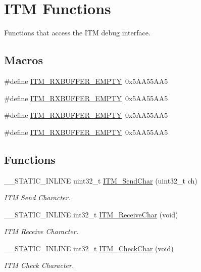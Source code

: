 \hypertarget{group__CMSIS__core__DebugFunctions}{}\section{I\+TM Functions}
\label{group__CMSIS__core__DebugFunctions}


Functions that access the I\+TM debug interface.  


\subsection*{Macros}
\begin{DoxyCompactItemize}
\item 
\#define \hyperlink{group__CMSIS__core__DebugFunctions_gaa822cb398ee022b59e9e6c5d7bbb228a}{I\+T\+M\+\_\+\+R\+X\+B\+U\+F\+F\+E\+R\+\_\+\+E\+M\+P\+TY}~0x5\+A\+A55\+A\+A5
\item 
\#define \hyperlink{group__CMSIS__core__DebugFunctions_gaa822cb398ee022b59e9e6c5d7bbb228a}{I\+T\+M\+\_\+\+R\+X\+B\+U\+F\+F\+E\+R\+\_\+\+E\+M\+P\+TY}~0x5\+A\+A55\+A\+A5
\item 
\#define \hyperlink{group__CMSIS__core__DebugFunctions_gaa822cb398ee022b59e9e6c5d7bbb228a}{I\+T\+M\+\_\+\+R\+X\+B\+U\+F\+F\+E\+R\+\_\+\+E\+M\+P\+TY}~0x5\+A\+A55\+A\+A5
\item 
\#define \hyperlink{group__CMSIS__core__DebugFunctions_gaa822cb398ee022b59e9e6c5d7bbb228a}{I\+T\+M\+\_\+\+R\+X\+B\+U\+F\+F\+E\+R\+\_\+\+E\+M\+P\+TY}~0x5\+A\+A55\+A\+A5
\end{DoxyCompactItemize}
\subsection*{Functions}
\begin{DoxyCompactItemize}
\item 
\+\_\+\+\_\+\+S\+T\+A\+T\+I\+C\+\_\+\+I\+N\+L\+I\+NE uint32\+\_\+t \hyperlink{group__CMSIS__core__DebugFunctions_gac90a497bd64286b84552c2c553d3419e}{I\+T\+M\+\_\+\+Send\+Char} (uint32\+\_\+t ch)
\begin{DoxyCompactList}\small\item\em I\+TM Send Character. \end{DoxyCompactList}\item 
\+\_\+\+\_\+\+S\+T\+A\+T\+I\+C\+\_\+\+I\+N\+L\+I\+NE int32\+\_\+t \hyperlink{group__CMSIS__core__DebugFunctions_gac3ee2c30a1ac4ed34c8a866a17decd53}{I\+T\+M\+\_\+\+Receive\+Char} (void)
\begin{DoxyCompactList}\small\item\em I\+TM Receive Character. \end{DoxyCompactList}\item 
\+\_\+\+\_\+\+S\+T\+A\+T\+I\+C\+\_\+\+I\+N\+L\+I\+NE int32\+\_\+t \hyperlink{group__CMSIS__core__DebugFunctions_gae61ce9ca5917735325cd93b0fb21dd29}{I\+T\+M\+\_\+\+Check\+Char} (void)
\begin{DoxyCompactList}\small\item\em I\+TM Check Character. \end{DoxyCompactList}\end{DoxyCompactItemize}
